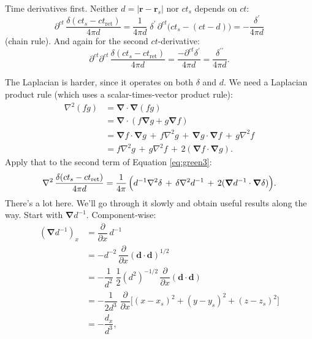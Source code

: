 \documentclass[12pt]{article}
\renewcommand{\vv}[1]{\mathbf{#1}}
\newcommand{\del}{\boldsymbol{\nabla}}
\begin{document}
Time derivatives first. Neither $d = \vert \vv r - \vv r_{s} \vert$ nor $ct_{s}$ depends on $ct$:
\begin{equation*}
\partial^{ct} \, \dfrac{\delta ( ct_{s} - ct_{\textrm{ret}} )}{4 \pi d} = \dfrac{1}{4 \pi d} \; \delta^\prime \, \partial^{ct} \Big( ct_{s} - (ct - d) \Big) = - \dfrac{\delta^\prime}{4 \pi d}
\end{equation*}
(chain rule). And again for the second $ct$-derivative:
\begin{equation}\label{gretctct}
\partial^{ct} \partial^{ct} \, \dfrac{\delta ( ct_{s} - ct_{\textrm{ret}} )}{4 \pi d} = \dfrac{- \partial^{ct} \delta^\prime}{4 \pi d} = \dfrac{\delta^{\prime \prime}}{4 \pi d} .
\end{equation}

The Laplacian is harder, since it operates on both $\delta$ and $d$. We need a Laplacian product rule (which uses a scalar-times-vector product rule):
\begin{equation*}
\begin{aligned}
\nabla^2 (fg) &= \del \cdot \del(fg) \\[2pt]
&= \del \cdot \left( f \del g + g \del f \right) \\[2pt]
&= \del f \cdot \del g \, + \, f \nabla^2 g \, + \, \del g \cdot \del f \, + \, g \nabla^2 f \\[2pt]
&= f \nabla^2 g \, + \, g \nabla^2 f \, + \, 2 ( \del f \cdot \del g ) .
\end{aligned}
\end{equation*}
Apply that to the second term of Equation \ref{eq:green3}:
\begin{equation}\label{gretlap1}
\nabla^2 \, \dfrac{\delta ( ct_{s} - ct_{\textrm{ret}} )}{4 \pi d} = \dfrac{1}{4 \pi} \, \Bigl( d^{-1} \nabla^2 \delta \, + \, \delta \nabla^2 d^{-1} \, + \, 2 (\del d^{-1} \cdot \del \delta) \Bigr) .
\end{equation}
There's a lot here. We'll go through it slowly and obtain useful results along the way. Start with $\del d^{-1}$. Component-wise:
\begin{equation*}
\begin{aligned}
( \del d^{-1} )_x &= \dfrac{\partial}{\partial x} \, d^{-1} \\[1pt]
&= - d^{-2} \, \dfrac{\partial}{\partial x} \left( \vv d \cdot \vv d \right) ^{1/2} \\[4pt]
&= - \dfrac{1}{d^{2}} \; \dfrac{1}{2} ( d^{2} ) ^{-1/2} \, \dfrac{\partial}{\partial x} \left( \vv d \cdot \vv d \right) \\[4pt]
&= - \dfrac{1}{2 d^{3}}  \; \dfrac{\partial}{\partial x} \big[ (x - x_{s})^2 + (y - y_{s})^2 + (z - z_{s})^2 \big] \\[5pt]
&= -\dfrac{d_x}{d ^{3}} ,
\end{aligned}
\end{equation*}
\end{document}

